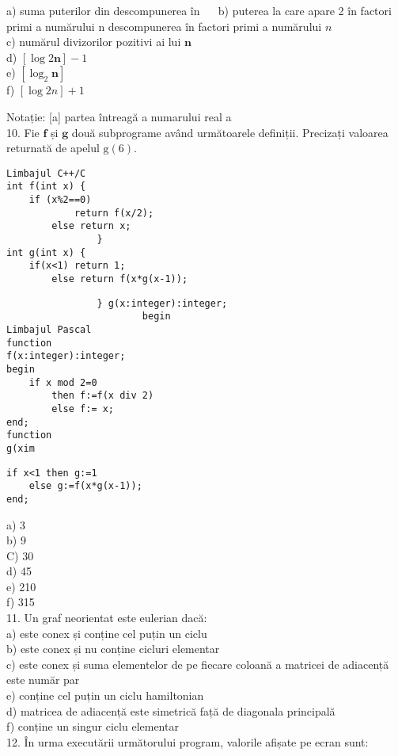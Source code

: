 a) suma puterilor din descompunerea în $\quad$ b) puterea la care apare 2 în factori primi a numărului n descompunerea în factori primi a numărului $n$\\
c) numărul divizorilor pozitivi ai lui $\mathbf{n}$\\
d) $[\log 2 \mathbf{n}]-1$\\
e) $\left[\log _{2} \mathbf{n}\right]$\\
f) $[\log 2 n]+1$

Notație: [a] partea întreagă a numarului real a\\
10. Fie $\mathbf{f}$ și $\mathbf{g}$ două subprograme având următoarele definiții. Precizați valoarea returnată de apelul $\mathrm{g}(6)$.

\begin{verbatim}
Limbajul C++/C
int f(int x) {
    if (x%2==0)
            return f(x/2);
        else return x;
                }
int g(int x) {
    if(x<1) return 1;
        else return f(x*g(x-1));
\end{verbatim}

\begin{verbatim}
                } g(x:integer):integer;
                        begin
Limbajul Pascal
function
f(x:integer):integer;
begin
    if x mod 2=0
        then f:=f(x div 2)
        else f:= x;
end;
function
g(xim
\end{verbatim}

\begin{verbatim}
if x<1 then g:=1
    else g:=f(x*g(x-1));
end;
\end{verbatim}

a) 3\\
b) 9\\
C) 30\\
d) 45\\
e) 210\\
f) 315\\
11. Un graf neorientat este eulerian dacă:\\
a) este conex și conține cel puțin un ciclu\\
b) este conex și nu conține cicluri elementar\\
c) este conex și suma elementelor de pe fiecare coloană a matricei de adiacență este număr par\\
e) conține cel puțin un ciclu hamiltonian\\
d) matricea de adiacență este simetrică față de diagonala principală\\
f) conține un singur ciclu elementar\\
12. În urma executării următorului program, valorile afișate pe ecran sunt:

